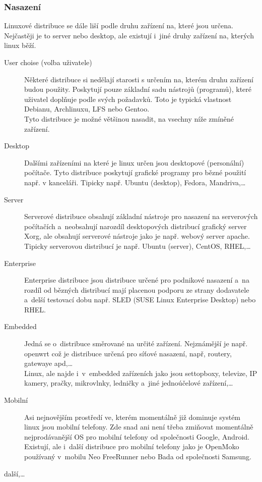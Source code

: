 \documentclass[a4paper,12pt]{article}
\begin{document}
\subsubsection{Nasazení}
Linuxové distribuce se dále liší podle druhu zařízení na, které jsou určena. Nejčastěji je to server nebo desktop, ale existují i~jiné druhy zařízení na, kterých linux běží.
\begin{description}
 \item[User choise (volba uživatele)] Některé distribuce si nedělají starosti s určením na, kterém druhu zařízení budou použity. Poskytují pouze základní sadu nástrojů (programů), které uživatel doplňuje podle svých požadavků. Toto je typická vlastnost Debianu, Archlinuxu, LFS nebo Gentoo.\\
Tyto distribuce je možné většinou nasadit, na vsechny níže zmíněné zařízení.
 \item[Desktop] Dalšími zařízeními na které je linux určen jsou desktopové (personální) počítače. Tyto distribuce poskytují grafické programy pro bězné použití např. v kanceláři. Tipicky např. Ubuntu (desktop), Fedora, Mandriva,…
 \item[Server] Serverové distribuce obsahují základní nástroje pro nasazení na serverových počítačích a~neobsahují narozdíl desktopových distribucí grafický server Xorg, ale obsahují serverové nástroje jako je např. webový server apache. Tipicky serverovou distribucí je např. Ubuntu (server), CentOS, RHEL,…
 \item[Enterprise] Enterprise distribuce jsou distribuce určené pro podnikové nasazení a~na rozdíl od bězných distribucí mají placenou podporu ze strany dodavatele a~delší testovací dobu např. SLED (SUSE Linux Enterprise Desktop) nebo RHEL.
 \item[Embedded] Jedná se o~distribuce směrované na určité zařízení. Nejznámější je např. openwrt což je distribuce určená pro síťové nasazení, např, routery, gatewaye apd,…\\
Linux, ale najde i~v~embedded zařízeních jako jsou settopboxy, televize, IP kamery, pračky, mikrovlnky, ledničky a~jiné jednoúčelové zařízení,…
 \item[Mobilní] Asi nejnovějším prostředí ve, kterém momentálně již dominuje systém linux jsou mobilní telefony. Zde snad ani není třeba zmiňovat momentálně nejprodávanější OS pro mobilní telefony od společnosti Google, Android. Existují, ale i~další distribuce pro mobilní telefony jako je OpenMoko používaný v~mobilu Neo FreeRunner nebo Bada od společnosti Samsung.
 \item[další,…] 
 \end{description}
\end{document}
